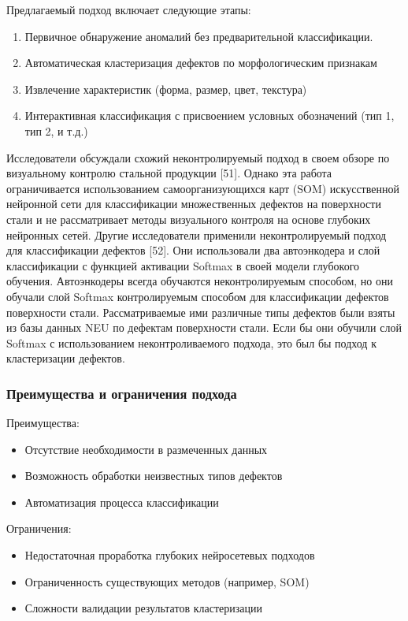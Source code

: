 \documentclass[14pt,a4paper]{article}
\begin{document}
Предлагаемый подход включает следующие этапы:
\begin{enumerate}
	\item Первичное обнаружение аномалий без предварительной классификации.
	\item Автоматическая кластеризация дефектов по морфологическим признакам
	\item Извлечение характеристик (форма, размер, цвет, текстура)
	\item Интерактивная классификация с присвоением условных обозначений (тип 1, тип 2, и т.д.)
\end{enumerate}

Исследователи обсуждали схожий неконтролируемый подход в своем обзоре по визуальному контролю стальной продукции [51]. Однако эта работа ограничивается использованием самоорганизующихся карт (SOM) искусственной нейронной сети для классификации множественных дефектов на поверхности стали и не рассматривает методы визуального контроля на основе глубоких нейронных сетей. Другие исследователи применили неконтролируемый подход для классификации дефектов [52]. Они использовали два автоэнкодера и слой классификации с функцией активации Softmax в своей модели глубокого обучения. Автоэнкодеры всегда обучаются неконтролируемым способом, но они обучали слой Softmax контролируемым способом для классификации дефектов поверхности стали. Рассматриваемые ими различные типы дефектов были взяты из базы данных NEU по дефектам поверхности стали. Если бы они обучили слой Softmax с использованием неконтроливаемого подхода, это был бы подход к кластеризации дефектов.

\subsubsection*{Преимущества и ограничения подхода}
Преимущества:
\begin{itemize}
	\item Отсутствие необходимости в размеченных данных
	\item Возможность обработки неизвестных типов дефектов
	\item Автоматизация процесса классификации
\end{itemize}

Ограничения:
\begin{itemize}
	\item Недостаточная проработка глубоких нейросетевых подходов
	\item Ограниченность существующих методов (например, SOM)
	\item Сложности валидации результатов кластеризации
\end{itemize} 
\end{document}
